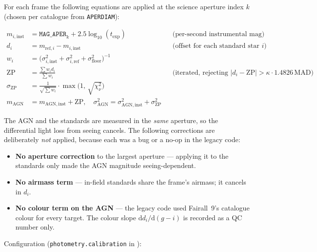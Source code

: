\documentclass[12pt,a4paper]{article}
\begin{document}
For each frame the following equations are applied at the science aperture
index $k$ (chosen per catalogue from \texttt{APERDIAM}):

\begin{align}
  m_{i,\mathrm{inst}} &= \texttt{MAG\_APER}_k + 2.5\log_{10}(t_\mathrm{exp})
    &&\text{(per-second instrumental mag)} \label{eq:minst}\\
  d_i &= m_{\mathrm{ref},i} - m_{i,\mathrm{inst}}
    &&\text{(offset for each standard star $i$)} \\
  w_i &= \bigl(\sigma_{i,\mathrm{inst}}^2 + \sigma_{i,\mathrm{ref}}^2 + \sigma_\mathrm{floor}^2\bigr)^{-1} \\
  \mathrm{ZP} &= \frac{\sum w_i d_i}{\sum w_i}
    &&\text{(iterated, rejecting $|d_i - \mathrm{ZP}| > \kappa \cdot 1.4826\,\mathrm{MAD}$)} \\
  \sigma_\mathrm{ZP} &= \frac{1}{\sqrt{\sum w_i}} \cdot \max\!\bigl(1,\,\sqrt{\chi^2_\nu}\bigr) \\
  m_\mathrm{AGN} &= m_\mathrm{AGN,inst} + \mathrm{ZP}, \quad
  \sigma_\mathrm{AGN}^2 = \sigma_\mathrm{AGN,inst}^2 + \sigma_\mathrm{ZP}^2
\end{align}

The AGN and the standards are measured in the \emph{same} aperture, so the
differential light loss from seeing cancels.  The following corrections are
deliberately \emph{not} applied, because each was a bug or a no-op in the
legacy code:

\begin{itemize}[noitemsep]
  \item \textbf{No aperture correction} to the largest aperture --- applying it
        to the standards only made the AGN magnitude seeing-dependent.
  \item \textbf{No airmass term} --- in-field standards share the frame's
        airmass; it cancels in $d_i$.
  \item \textbf{No colour term on the AGN} --- the legacy code used Fairall~9's
        catalogue colour for every target.  The colour slope
        $\mathrm{d}d_i / \mathrm{d}(g-i)$ is recorded as a QC number only.
\end{itemize}

Configuration (\texttt{photometry.calibration} in ):
\end{document}
